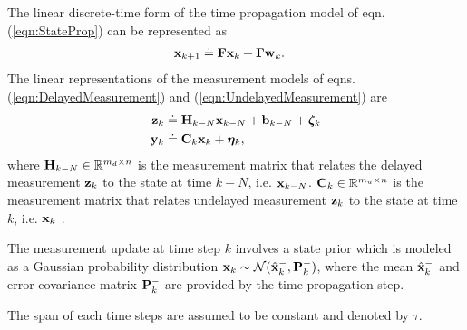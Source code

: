 The linear discrete-time form of the time propagation model of eqn. (\ref{eqn:StateProp}) can be represented as
\begin{align}
	\label{eqn:LinearStateProp}
	\mathbf{x}_{k+1} &\doteq \mathbf{F} \mathbf{x}_k + \boldsymbol{\Gamma} \mathbf{w}_k.
\end{align}
The linear representations of the measurement models of eqns. (\ref{eqn:DelayedMeasurement}) and (\ref{eqn:UndelayedMeasurement}) are
\begin{align} \label{eqn:LinearDelayedMeasurement}
	\mathbf{z}_k &\doteq \mathbf{H}_{k-N} \mathbf{x}_{k-N} + \mathbf{b}_{k-N} +\boldsymbol{\zeta}_k \\
	\label{eqn:LinearUndelayedMeasurement}
	\mathbf{y}_k &\doteq \mathbf{C}_k \mathbf{x}_k + \boldsymbol{\eta}_k,
\end{align}
where $\mathbf{H}_{k-N} \in \mathbb{R}^{m_d \times n}$ is the measurement matrix that relates the delayed measurement $\mathbf{z}_{k}$ to the state at time $k-N$, i.e. $\mathbf{x}_{k-N}$. 
$\mathbf{C}_k\in \mathbb{R}^{m_u \times n}$ is the measurement matrix that relates undelayed measurement $\mathbf{z}_k$ to the state at time $k$, i.e. $\mathbf{x}_k$ .

The measurement update at time step $k$ involves a state prior which is modeled as a Gaussian probability distribution $\mathbf{x}_k \sim \mathcal{N}(\hat{\mathbf{x}}_k^-,\mathbf{P}_k^-)$, where the mean $\hat{\mathbf{x}}_k^-$ and error covariance matrix $\mathbf{P}_k^-$ are provided by the time propagation step.

The span of each time steps are assumed to be constant and denoted by $\tau$.